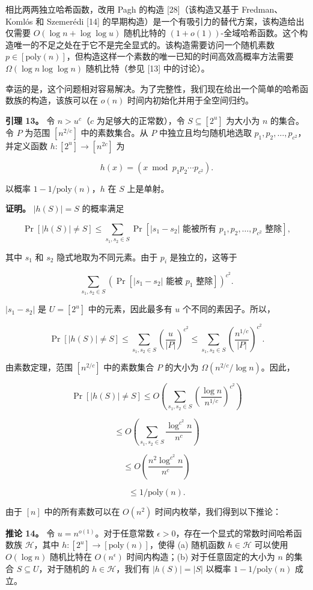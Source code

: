 \documentclass[12pt,a4paper]{ctexart}
\theoremstyle{remark}
\begin{document}
相比两两独立哈希函数，改用 Pagh 的构造 [28]（该构造又基于 Fredman、Komlós 和 Szemerédi [14] 的早期构造）是一个有吸引力的替代方案，该构造给出仅需要 $O(\log n+\log\log u)$ 随机比特的 $(1+o(1))$-全域哈希函数。这个构造唯一的不足之处在于它不是完全显式的。该构造需要访问一个随机素数 $p\in[\text{poly}(n)]$，但构造这样一个素数的唯一已知的时间高效高概率方法需要 $\Omega(\log n\log\log n)$ 随机比特（参见 [13] 中的讨论）。

幸运的是，这个问题相对容易解决。为了完整性，我们现在给出一个简单的哈希函数族的构造，该族可以在 $o(n)$ 时间内初始化并用于全空间归约。

\textbf{引理 13。} 令 $n>u^c$（$c$ 为足够大的正常数），令 $S\subseteq[2^u]$ 为大小为 $n$ 的集合。令 $P$ 为范围 $[n^{2/c}]$ 中的素数集合。从 $P$ 中独立且均匀随机地选取 $p_1,p_2,\ldots,p_{c^2}$，并定义函数 $h:[2^u]\to[n^{2c}]$ 为

$$h(x)=(x\bmod p_1p_2\cdots p_{c^2}).$$

以概率 $1-1/\text{poly}(n)$，$h$ 在 $S$ 上是单射。

\textbf{证明。} $|h(S)|=S$ 的概率满足

$$\Pr[|h(S)|\neq S]\leq\sum_{s_1,s_2\in S}\Pr[|s_1-s_2|\text{ 能被所有 }p_1,p_2,\ldots,p_{c^2}\text{ 整除}],$$

其中 $s_1$ 和 $s_2$ 隐式地取为不同元素。由于 $p_i$ 是独立的，这等于

$$\sum_{s_1,s_2\in S}\left(\Pr[|s_1-s_2|\text{ 能被 }p_1\text{ 整除}]\right)^{c^2}.$$

$|s_1-s_2|$ 是 $U=[2^u]$ 中的元素，因此最多有 $u$ 个不同的素因子。所以，

$$\Pr[|h(S)|\neq S]\leq\sum_{s_1,s_2\in S}\left(\frac{u}{|P|}\right)^{c^2}\leq\sum_{s_1,s_2\in S}\left(\frac{n^{1/c}}{|P|}\right)^{c^2}.$$

由素数定理，范围 $[n^{2/c}]$ 中的素数集合 $P$ 的大小为 $\Omega(n^{2/c}/\log n)$。因此，

$$\Pr[|h(S)|\neq S]\leq O\left(\sum_{s_1,s_2\in S}\left(\frac{\log n}{n^{1/c}}\right)^{c^2}\right)$$

$$\leq O\left(\sum_{s_1,s_2\in S}\frac{\log^{c^2} n}{n^c}\right)$$

$$\leq O\left(\frac{n^2\log^{c^2} n}{n^c}\right)$$

$$\leq 1/\text{poly}(n).$$

由于 $[n]$ 中的所有素数可以在 $O(n^2)$ 时间内枚举，我们得到以下推论：

\textbf{推论 14。} 令 $u=n^{o(1)}$。对于任意常数 $\epsilon>0$，存在一个显式的常数时间哈希函数族 $\mathcal{H}$，其中 $h:[2^u]\to[\text{poly}(n)]$，使得 (a) 随机函数 $h\in\mathcal{H}$ 可以使用 $O(\log n)$ 随机比特在 $O(n^{\epsilon})$ 时间内构造；(b) 对于任意固定的大小为 $n$ 的集合 $S\subseteq U$，对于随机的 $h\in\mathcal{H}$，我们有 $|h(S)|=|S|$ 以概率 $1-1/\text{poly}(n)$ 成立。
\end{document}
